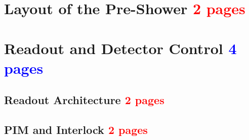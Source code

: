 	\section{Layout of the Pre-Shower  \textcolor{red}{ 2 pages}}
	
	
		
		
		
		
		
		
		
		
		
		
		
		
		
		
		
		
		
		
		
		
		
		
		
		
		
		
		
		
		
		
		
		
		
		
		
		
		
		
	\clearpage	
	\section{Readout and Detector Control  \textcolor{blue}{ 4 pages}}
		\subsection{Readout Architecture\textcolor{red}{ 2 pages}}
		\subsection{PIM and Interlock \textcolor{red}{ 2 pages}}